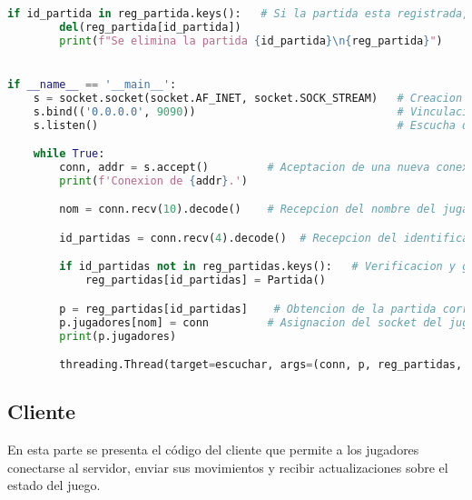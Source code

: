 \documentclass{article}
\begin{document}
\begin{lstlisting}[language=Python, caption={Código Python}, label={lst:python_code.}]
    if id_partida in reg_partida.keys():   # Si la partida esta registrada, elimina la partida del registro al finalizar
        del(reg_partida[id_partida])
        print(f"Se elimina la partida {id_partida}\n{reg_partida}")


if __name__ == '__main__':
    s = socket.socket(socket.AF_INET, socket.SOCK_STREAM)   # Creacion de un socket TCP/IP
    s.bind(('0.0.0.0', 9090))                               # Vinculacion del socket a la direccion y puerto deseados
    s.listen()                                              # Escucha de conexiones entrantes

    while True:
        conn, addr = s.accept()         # Aceptacion de una nueva conexion
        print(f'Conexion de {addr}.')

        nom = conn.recv(10).decode()    # Recepcion del nombre del jugador

        id_partidas = conn.recv(4).decode()  # Recepcion del identificador de la partida

        if id_partidas not in reg_partidas.keys():   # Verificacion y gestion de la partida en el registro de partidas
            reg_partidas[id_partidas] = Partida()

        p = reg_partidas[id_partidas]    # Obtencion de la partida correspondiente
        p.jugadores[nom] = conn         # Asignacion del socket del jugador a la partida
        print(p.jugadores)

        threading.Thread(target=escuchar, args=(conn, p, reg_partidas, id_partidas,)).start()    # Inicio de un hilo para escuchar los movimientos del jugador en la partida

\end{lstlisting}

\subsection{Cliente}
En esta parte se presenta el código del cliente que permite a los jugadores conectarse al servidor, enviar sus movimientos y recibir actualizaciones sobre el estado del juego.
\end{document}
